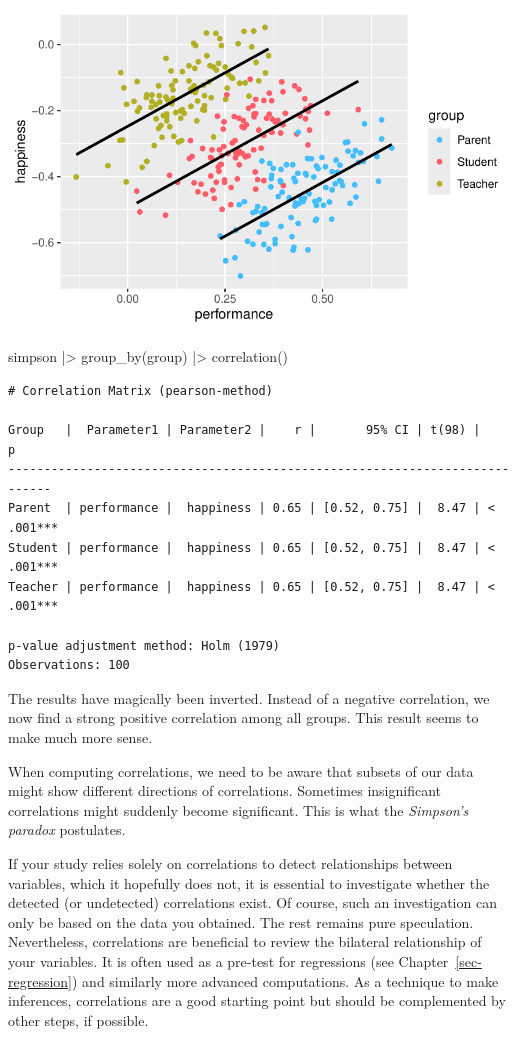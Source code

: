 \documentclass[
  letterpaper,
]{krantz}
\makeatletter
\newenvironment{Shaded}{\begin{snugshade}}{\end{snugshade}}
\newcommand{\FunctionTok}[1]{\textcolor[rgb]{0.28,0.35,0.67}{#1}}
\newcommand{\NormalTok}[1]{\textcolor[rgb]{0.00,0.23,0.31}{#1}}
\newcommand{\SpecialCharTok}[1]{\textcolor[rgb]{0.37,0.37,0.37}{#1}}
\newenvironment{kframe}{%
\medskip{}
\setlength{\fboxsep}{.8em}
 \def\at@end@of@kframe{}%
 \ifinner\ifhmode%
  \def\at@end@of@kframe{\end{minipage}}%
  \begin{minipage}{\columnwidth}%
 \fi\fi%
 \def\FrameCommand##1{\hskip\@totalleftmargin \hskip-\fboxsep
 \colorbox{shadecolor}{##1}\hskip-\fboxsep
     \hskip-\linewidth \hskip-\@totalleftmargin \hskip\columnwidth}%
 \MakeFramed {\advance\hsize-\width
   \@totalleftmargin\z@ \linewidth\hsize
   \@setminipage}}%
 {\par\unskip\endMakeFramed%
 \at@end@of@kframe}
\renewenvironment{Shaded}{\begin{kframe}}{\end{kframe}}
\makeatother
\begin{document}
\includegraphics{10_correlations_files/figure-pdf/simpson-paradox-plot-groups-1.pdf}

\begin{Shaded}
\begin{Highlighting}[]
\NormalTok{simpson }\SpecialCharTok{|\textgreater{}}
  \FunctionTok{group\_by}\NormalTok{(group) }\SpecialCharTok{|\textgreater{}}
  \FunctionTok{correlation}\NormalTok{()}
\end{Highlighting}
\end{Shaded}

\begin{verbatim}
# Correlation Matrix (pearson-method)

Group   |  Parameter1 | Parameter2 |    r |       95% CI | t(98) |         p
----------------------------------------------------------------------------
Parent  | performance |  happiness | 0.65 | [0.52, 0.75] |  8.47 | < .001***
Student | performance |  happiness | 0.65 | [0.52, 0.75] |  8.47 | < .001***
Teacher | performance |  happiness | 0.65 | [0.52, 0.75] |  8.47 | < .001***

p-value adjustment method: Holm (1979)
Observations: 100
\end{verbatim}

The results have magically been inverted. Instead of a negative
correlation, we now find a strong positive correlation among all groups.
This result seems to make much more sense.

When computing correlations, we need to be aware that subsets of our
data might show different directions of correlations. Sometimes
insignificant correlations might suddenly become significant. This is
what the \emph{Simpson's paradox} postulates.

If your study relies solely on correlations to detect relationships
between variables, which it hopefully does not, it is essential to
investigate whether the detected (or undetected) correlations exist. Of
course, such an investigation can only be based on the data you
obtained. The rest remains pure speculation. Nevertheless, correlations
are beneficial to review the bilateral relationship of your variables.
It is often used as a pre-test for regressions (see
Chapter~\ref{sec-regression}) and similarly more advanced computations.
As a technique to make inferences, correlations are a good starting
point but should be complemented by other steps, if possible.
\end{document}
